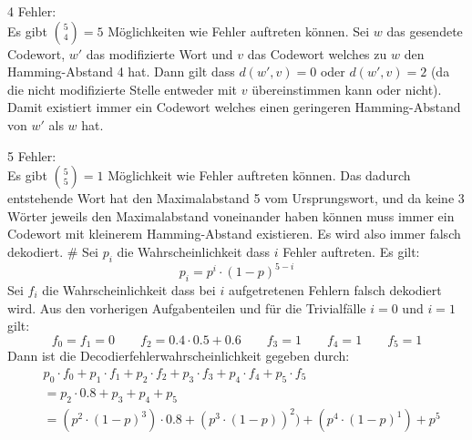 \begin{myList}
4 Fehler:\\
Es gibt $\binom{5}{4} = 5$ Möglichkeiten wie Fehler auftreten können.
Sei $w$ das gesendete Codewort, $w'$ das modifizierte Wort und $v$ das Codewort welches zu $w$ den Hamming-Abstand 4 hat.
Dann gilt dass $d(w',v) = 0$ oder $d(w',v) = 2$ (da die nicht modifizierte Stelle entweder mit $v$ übereinstimmen kann oder nicht).
Damit existiert immer ein Codewort welches einen geringeren Hamming-Abstand von $w'$ als $w$ hat.
\medskip

5 Fehler:\\
Es gibt $\binom{5}{5} = 1$ Möglichkeit wie Fehler auftreten können.
Das dadurch entstehende Wort hat den Maximalabstand 5 vom Ursprungswort, und da keine 3 Wörter jeweils den Maximalabstand voneinander haben können muss immer ein Codewort mit kleinerem Hamming-Abstand existieren.
Es wird also immer falsch dekodiert.
#
Sei $p_i$ die Wahrscheinlichkeit dass $i$ Fehler auftreten. Es gilt:
\begin{equation*}
	p_i = p^i \cdot (1-p)^{5-i}
\end{equation*}
Sei $f_i$ die Wahrscheinlichkeit dass bei $i$ aufgetretenen Fehlern falsch dekodiert wird. Aus den vorherigen Aufgabenteilen und für die Trivialfälle $i = 0$ und $i = 1$ gilt:
\begin{equation*}
	f_0 = f_1 = 0 \qquad f_2 = 0.4\cdot 0.5 + 0.6 \qquad f_3 = 1 \qquad f_4 = 1 \qquad f_5 = 1
\end{equation*}
Dann ist die Decodierfehlerwahrscheinlichkeit gegeben durch:
\begin{align*}
	&p_0 \cdot f_0 + p_1 \cdot f_1 + p_2 \cdot f_2 + p_3 \cdot f_3 + p_4 \cdot f_4 + p_5 \cdot f_5 \\
	&= p_2 \cdot 0.8 + p_3  + p_4  + p_5 \\
	&= (p^2 \cdot (1-p)^3) \cdot 0.8 + (p^3 \cdot (1-p))^2) + (p^4 \cdot (1-p)^1) + p^5
\end{align*}
\end{myList}






